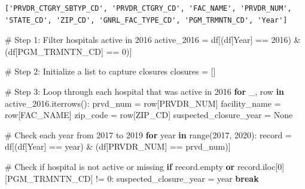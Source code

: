 \documentclass[
  letterpaper,
  DIV=11,
  numbers=noendperiod]{scrartcl}
\newenvironment{Shaded}{\begin{snugshade}}{\end{snugshade}}
\newcommand{\BuiltInTok}[1]{\textcolor[rgb]{0.00,0.23,0.31}{#1}}
\newcommand{\CommentTok}[1]{\textcolor[rgb]{0.37,0.37,0.37}{#1}}
\newcommand{\ControlFlowTok}[1]{\textcolor[rgb]{0.00,0.23,0.31}{\textbf{#1}}}
\newcommand{\DecValTok}[1]{\textcolor[rgb]{0.68,0.00,0.00}{#1}}
\newcommand{\KeywordTok}[1]{\textcolor[rgb]{0.00,0.23,0.31}{\textbf{#1}}}
\newcommand{\NormalTok}[1]{\textcolor[rgb]{0.00,0.23,0.31}{#1}}
\newcommand{\OperatorTok}[1]{\textcolor[rgb]{0.37,0.37,0.37}{#1}}
\newcommand{\StringTok}[1]{\textcolor[rgb]{0.13,0.47,0.30}{#1}}
\newcommand{\VariableTok}[1]{\textcolor[rgb]{0.07,0.07,0.07}{#1}}
\begin{document}
\begin{verbatim}
['PRVDR_CTGRY_SBTYP_CD', 'PRVDR_CTGRY_CD', 'FAC_NAME', 'PRVDR_NUM', 'STATE_CD', 'ZIP_CD', 'GNRL_FAC_TYPE_CD', 'PGM_TRMNTN_CD', 'Year']
\end{verbatim}

\begin{Shaded}
\begin{Highlighting}[]
\CommentTok{\# Step 1: Filter hospitals active in 2016}
\NormalTok{active\_2016 }\OperatorTok{=}\NormalTok{ df[(df[}\StringTok{\textquotesingle{}Year\textquotesingle{}}\NormalTok{] }\OperatorTok{==} \DecValTok{2016}\NormalTok{) }\OperatorTok{\&}\NormalTok{ (df[}\StringTok{\textquotesingle{}PGM\_TRMNTN\_CD\textquotesingle{}}\NormalTok{] }\OperatorTok{==} \DecValTok{0}\NormalTok{)]}

\CommentTok{\# Step 2: Initialize a list to capture closures}
\NormalTok{closures }\OperatorTok{=}\NormalTok{ []}

\CommentTok{\# Step 3: Loop through each hospital that was active in 2016}
\ControlFlowTok{for}\NormalTok{ \_, row }\KeywordTok{in}\NormalTok{ active\_2016.iterrows():}
\NormalTok{    prvd\_num }\OperatorTok{=}\NormalTok{ row[}\StringTok{\textquotesingle{}PRVDR\_NUM\textquotesingle{}}\NormalTok{]}
\NormalTok{    facility\_name }\OperatorTok{=}\NormalTok{ row[}\StringTok{\textquotesingle{}FAC\_NAME\textquotesingle{}}\NormalTok{]}
\NormalTok{    zip\_code }\OperatorTok{=}\NormalTok{ row[}\StringTok{\textquotesingle{}ZIP\_CD\textquotesingle{}}\NormalTok{]}
\NormalTok{    suspected\_closure\_year }\OperatorTok{=} \VariableTok{None}

    \CommentTok{\# Check each year from 2017 to 2019}
    \ControlFlowTok{for}\NormalTok{ year }\KeywordTok{in} \BuiltInTok{range}\NormalTok{(}\DecValTok{2017}\NormalTok{, }\DecValTok{2020}\NormalTok{):}
\NormalTok{        record }\OperatorTok{=}\NormalTok{ df[(df[}\StringTok{\textquotesingle{}Year\textquotesingle{}}\NormalTok{] }\OperatorTok{==}\NormalTok{ year) }\OperatorTok{\&}\NormalTok{ (df[}\StringTok{\textquotesingle{}PRVDR\_NUM\textquotesingle{}}\NormalTok{] }\OperatorTok{==}\NormalTok{ prvd\_num)]}

        \CommentTok{\# Check if hospital is not active or missing}
        \ControlFlowTok{if}\NormalTok{ record.empty }\KeywordTok{or}\NormalTok{ record.iloc[}\DecValTok{0}\NormalTok{][}\StringTok{\textquotesingle{}PGM\_TRMNTN\_CD\textquotesingle{}}\NormalTok{] }\OperatorTok{!=} \DecValTok{0}\NormalTok{:}
\NormalTok{            suspected\_closure\_year }\OperatorTok{=}\NormalTok{ year}
            \ControlFlowTok{break}


\end{Highlighting}
\end{Shaded}
\end{document}
